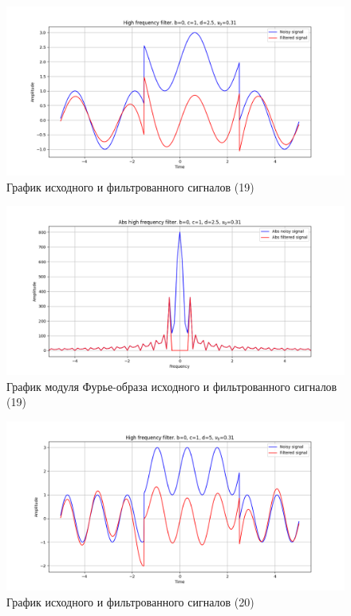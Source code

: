 \documentclass[a4paper, 12pt]{article}
\begin{document}
    \begin{figure}[!htb]
        \centering
        \includegraphics[scale=0.48]{19_u_flt_u_nolow.png}
        \captionsetup{skip=0pt}
        \caption{График исходного и фильтрованного сигналов (19)}
        \label{fig:fig63}
    \end{figure}
    \begin{figure}[!htb]
        \centering
        \includegraphics[scale=0.48]{19_abs_u_U_nolow.png}
        \captionsetup{skip=0pt}
        \caption{График модуля Фурье-образа исходного и фильтрованного сигналов (19)}
        \label{fig:fig64}
    \end{figure}
    \newpage
    \begin{figure}[!htb]
        \centering
        \includegraphics[scale=0.48]{20_u_flt_u_nolow.png}
        \captionsetup{skip=0pt}
        \caption{График исходного и фильтрованного сигналов (20)}
        \label{fig:fig65}
    \end{figure}
\end{document}
